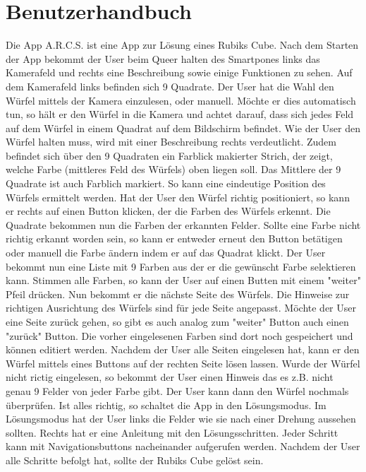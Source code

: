 \section{Benutzerhandbuch}  %
Die App A.R.C.S. ist eine App zur Lösung eines Rubiks Cube.
Nach dem Starten der App bekommt der User beim Queer halten des Smartpones links das Kamerafeld und rechts
eine Beschreibung sowie einige Funktionen zu sehen. Auf dem Kamerafeld links befinden sich 9 Quadrate.
Der User hat die Wahl den Würfel mittels der Kamera einzulesen, oder manuell. Möchte er dies automatisch tun,
so hält er den Würfel in die Kamera und achtet darauf, dass sich jedes Feld auf dem Würfel in einem Quadrat
auf dem Bildschirm befindet. Wie der User den Würfel halten muss, wird mit einer Beschreibung rechts verdeutlicht.
Zudem befindet sich über den 9 Quadraten ein Farblick makierter Strich, der zeigt, welche Farbe (mittleres Feld
des Würfels) oben liegen soll. Das Mittlere der 9 Quadrate ist auch Farblich markiert. So kann eine eindeutige
Position des Würfels ermittelt werden. Hat der User den Würfel richtig positioniert, so kann er rechts auf einen
Button klicken, der die Farben des Würfels erkennt. Die Quadrate bekommen nun die Farben der erkannten Felder.
Sollte eine Farbe nicht richtig erkannt worden sein, so kann er entweder erneut den Button betätigen oder manuell
die Farbe ändern indem er auf das Quadrat klickt. Der User bekommt nun eine Liste mit 9 Farben aus der er die
gewünscht Farbe selektieren kann. Stimmen alle Farben, so kann der User auf einen Butten mit einem "weiter"
Pfeil drücken. Nun bekommt er die nächste Seite des Würfels. Die Hinweise zur richtigen Ausrichtung des Würfels
sind für jede Seite angepasst. Möchte der User eine Seite zurück gehen, so gibt es auch analog zum "weiter" Button
auch einen "zurück" Button. Die vorher eingelesenen Farben sind dort noch gespeichert und können editiert werden.
Nachdem der User alle Seiten eingelesen hat, kann er den Würfel mittels eines Buttons auf der rechten Seite lösen
lassen. Wurde der Würfel nicht rictig eingelesen, so bekommt der User einen Hinweis das es z.B. nicht genau 9
Felder von jeder Farbe gibt. Der User kann dann den Würfel nochmals überprüfen. Ist alles richtig, so schaltet
die App in den Lösungsmodus. Im Lösungsmodus hat der User links die Felder wie sie nach einer Drehung aussehen
sollten. Rechts hat er eine Anleitung mit den Lösungsschritten. Jeder Schritt kann mit Navigationsbuttons
nacheinander aufgerufen werden. Nachdem der User alle Schritte befolgt hat, sollte der Rubiks Cube gelöst sein.

